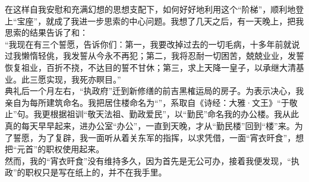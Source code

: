 在这样自我安慰和充满幻想的思想支配下，如何好好地利用这个“阶梯”，顺利地登上“宝座”，就成了我进一步思索的中心问题。我想了几天之后，有一天晚上，把我思索的结果告诉了和：\\

“我现在有三个誓愿，告诉你们：第一，我要改掉过去的一切毛病，十多年前就说过我懒惰轻佻，我发誓从今永不再犯；第二，我将忍耐一切困苦，兢兢业业，发誓恢复祖业，百折不挠，不达目的誓不甘休；第三，求上天降一皇子，以承继大清基业。此三愿实现，我死亦瞑目。”\\

典礼后一个月左右，“执政府”迁到新修缮的前吉黑榷运局的房子。为表示决心，我亲自为每所建筑命名。我把居住楼命名为“”，系取自《诗经：大雅·文王》“于敬止”句。我更根据祖训“敬天法祖、勤政爱民”，以“勤民”命名我的办公楼。我从此真的每天早早起来，进办公室“办公”，一直到天晚，才从“勤民楼”回到“楼”来。为了誓愿，为了复辟，我一面听从着关东军的指挥，以求凭借，一面“宵衣旰食”，想把“元首”的职权使用起来。\\

然而，我的“宵衣旰食”没有维持多久，因为首先是无公可办，接着我便发现，“执政”的职权只是写在纸上的，并不在我手里。
